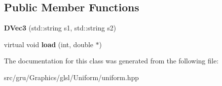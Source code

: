 \subsection*{\-Public \-Member \-Functions}
\begin{DoxyCompactItemize}
\item 
\hypertarget{classglutpp_1_1glsl_1_1Uniform_1_1Vector_1_1DVec3_a3525fcd35d13cda8ce0784ca1821358b}{{\bfseries \-D\-Vec3} (std\-::string s1, std\-::string s2)}\label{classglutpp_1_1glsl_1_1Uniform_1_1Vector_1_1DVec3_a3525fcd35d13cda8ce0784ca1821358b}

\item 
\hypertarget{classglutpp_1_1glsl_1_1Uniform_1_1Vector_1_1DVec3_ac896552e6bf80e9f874d7b37fc9e8315}{virtual void {\bfseries load} (int, double $\ast$)}\label{classglutpp_1_1glsl_1_1Uniform_1_1Vector_1_1DVec3_ac896552e6bf80e9f874d7b37fc9e8315}

\end{DoxyCompactItemize}


\-The documentation for this class was generated from the following file\-:\begin{DoxyCompactItemize}
\item 
src/gru/\-Graphics/glsl/\-Uniform/uniform.\-hpp\end{DoxyCompactItemize}
